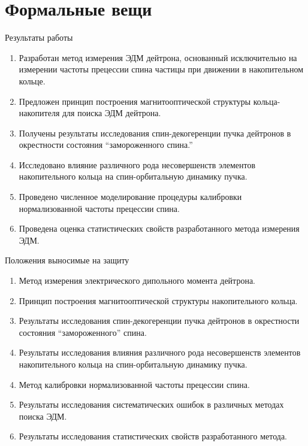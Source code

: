 \documentclass[14pt]{beamer}
\begin{document}
\section{Формальные вещи}
\begin{frame}{Результаты работы}
	\begin{enumerate}
		\item Разработан метод измерения ЭДМ дейтрона, основанный исключительно на измерении частоты прецессии спина частицы 
		при движении в накопительном кольце.
		\item Предложен принцип построения магнитооптической структуры кольца-накопителя для поиска ЭДМ дейтрона.
		\item Получены результаты исследования спин-декогеренции пучка дейтронов в окрестности 
		состояния ``замороженного спина.''
	\end{enumerate}
\end{frame}
\begin{frame}
	\begin{enumerate}\setcounter{enumi}{3}
		\item Исследовано влияние различного рода несовершенств элементов накопительного кольца 
		на спин-орбитальную динамику пучка.
		\item Проведено численное моделирование процедуры калибровки нормализованной частоты прецессии спина. 
		\item Проведена оценка статистических свойств разработанного метода измерения ЭДМ.
	\end{enumerate}
\end{frame}
\begin{frame}{Положения выносимые на защиту}
	\begin{enumerate}
		\item Метод измерения электрического дипольного момента дейтрона.
		\item Принцип построения магнитооптической структуры накопительного кольца.
		\item Результаты исследования спин-декогеренции пучка дейтронов в окрестности состояния ``замороженного'' спина.
		\item Результаты исследования влияния различного рода несовершенств элементов накопительного кольца 
		на спин-орбитальную динамику пучка. 
	\end{enumerate}
\end{frame}
\begin{frame}
	\begin{enumerate}\setcounter{enumi}{3}
		\item Метод калибровки нормализованной частоты прецессии спина.
		\item Результаты исследования систематических ошибок в различных методах поиска ЭДМ. 
		\item Результаты исследования статистических свойств разработанного метода.
	\end{enumerate}
\end{frame}
\end{document}
